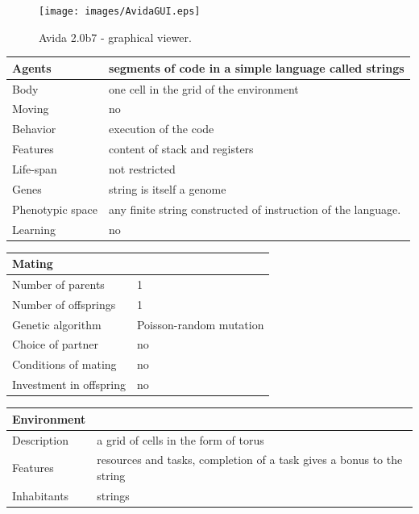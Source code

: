 \documentclass[a4paper,12pt]{report}
\begin{document}
\begin{figure}
\begin{center}
  \texttt{[image: images/AvidaGUI.eps]}
  \caption{Avida 2.0b7 - graphical viewer.}
  \label{img.Avida}
\end{center}
\end{figure}

\vspace{20pt}

\begin{tabular}{|p{150pt}|p{220pt}|}
\hline
\textbf{Agents}&segments of code in a simple language called strings  \\ \hline
Body&one cell in the grid of the environment \\ \hline
Moving&no \\ \hline
Behavior&execution of the code \\ \hline
Features&content of stack and registers \\ \hline
Life-span&not restricted \\ \hline
Genes&string is itself a genome \\ \hline
Phenotypic space&any finite string constructed of instruction of the language. \\ \hline
Learning&no \\ \hline 
\end{tabular}
 
\vspace{10pt}
\begin{tabular}{|p{150pt}|p{220pt}|} 
\hline \textbf{Mating}& \\ \hline
Number of parents&1 \\ \hline
Number of offsprings&1 \\ \hline
Genetic algorithm&Poisson-random mutation \\ \hline
Choice of partner&no \\ \hline
Conditions of mating&no \\ \hline
Investment in offspring&no \\ \hline 
\end{tabular} 

\vspace{10pt}
\begin{tabular}{|p{150pt}|p{220pt}|} 
\hline 
\textbf{Environment}& \\ \hline
Description&a grid of cells in the form of torus \\ \hline
Features&resources and tasks, completion of a task gives a bonus to the string \\ \hline
Inhabitants&strings \\ \hline 
\end{tabular} 
\end{document}
